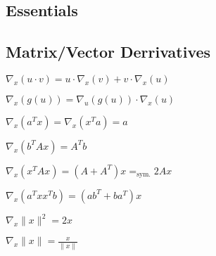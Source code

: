 \documentclass[a4paper, 11pt, landscape]{article}
\begin{document}
\begin{multicols*}{3}

    \section{Essentials}

    \subsection{Matrix/Vector Derrivatives}
    \begin{compactdesc}
        \begin{inparaitem}[\color{red}\textbullet]
        \item $\nabla_{x}(u \cdot v) = u \cdot \nabla_{x}(v) + v \cdot \nabla_{x}(u)$
        \item $\nabla_{x}(g(u)) = \nabla_{u}(g(u)) \cdot \nabla_{x}(u)$
        \item $\nabla_{x}(a^Tx) = \nabla_{x}(x^Ta) = a$
        \item $\nabla_{x}(b^TAx) = A^Tb$
        \item $\nabla_{x}(x^TAx) = (A + A^T)x =_{\text{sym.}} 2Ax$
        \item $\nabla_{x}(a^Txx^Tb) = (ab^T + ba^T)x$
        \item $\nabla_{x}\|x\|^2 = 2x$
        \item $\nabla_{x}\|x\| = \frac{x}{\|x\|} $
        \end{inparaitem}
    \end{compactdesc}


\end{multicols*}
\end{document}
